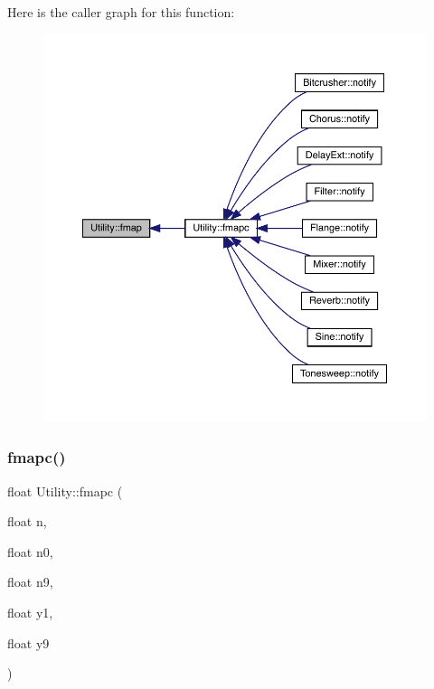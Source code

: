 Here is the caller graph for this function\+:\nopagebreak
\begin{figure}[H]
\begin{center}
\leavevmode
\includegraphics[width=350pt]{class_utility_ad35eff6790f16f4afcd546cb5de861c2_icgraph}
\end{center}
\end{figure}
\mbox{\label{class_utility_abee51df02bf586bd7d6bc36481152402}} 
\subsubsection{\texorpdfstring{fmapc()}{fmapc()}}
{\footnotesize\ttfamily float Utility\+::fmapc (\begin{DoxyParamCaption}\item[{float}]{n,  }\item[{float}]{n0,  }\item[{float}]{n9,  }\item[{float}]{y1,  }\item[{float}]{y9 }\end{DoxyParamCaption})\hspace{0.3cm}{\ttfamily [static]}}

